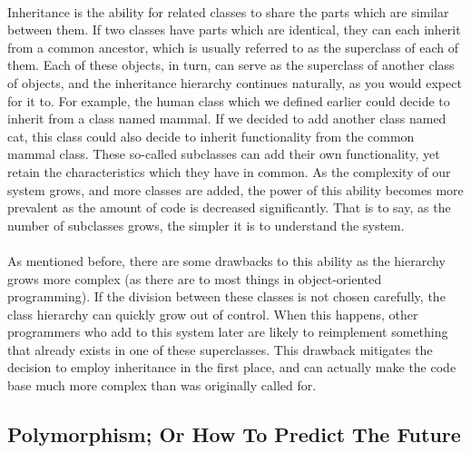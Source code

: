 \documentclass{article}
\begin{document}
\paragraph{}
Inheritance is the ability for related classes to share the parts which are
similar between them. If two classes have parts which are identical, they can
each inherit from a common ancestor, which is usually referred to as the
superclass of each of them. Each of these objects, in turn, can serve as the
superclass of another class of objects, and the inheritance hierarchy continues
naturally, as you would expect for it to. For example, the human class which we
defined earlier could decide to inherit from a class named mammal. If we decided
to add another class named cat, this class could also decide to inherit
functionality from the common mammal class. These so-called subclasses can add
their own functionality, yet retain the characteristics which they have in
common. As the complexity of our system grows, and more classes are added, the
power of this ability becomes more prevalent as the amount of code is decreased
significantly. That is to say, as the number of subclasses grows, the simpler it
is to understand the system.
\paragraph{}
As mentioned before, there are some drawbacks to this ability as the hierarchy
grows more complex (as there are to most things in object-oriented programming).
If the division between these classes is not chosen carefully, the class
hierarchy can quickly grow out of control. When this happens, other programmers
who add to this system later are likely to reimplement something that already
exists in one of these superclasses. This drawback mitigates the decision to
employ inheritance in the first place, and can actually make the code base much
more complex than was originally called for.

\subsection{Polymorphism; Or How To Predict The Future}
\end{document}

